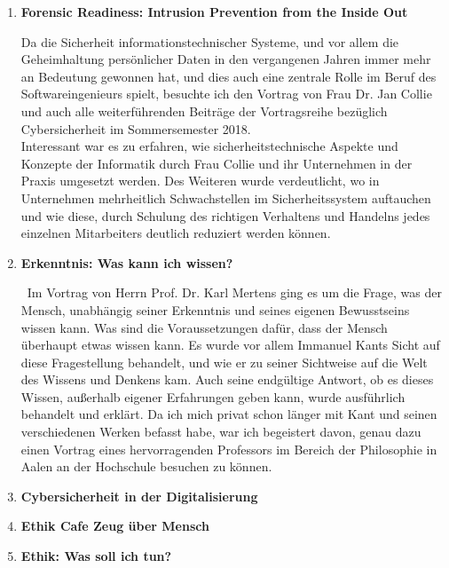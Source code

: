 \documentclass[a4paper, 12pt]{scrartcl} %
\begin{document}
\begin{enumerate}
\vspace{0.5cm}
\item\textbf{Forensic Readiness: Intrusion Prevention from the Inside Out}\par
Da die Sicherheit informationstechnischer Systeme, und vor allem die Geheimhaltung persönlicher Daten in den vergangenen Jahren immer mehr an Bedeutung gewonnen hat, und dies auch eine zentrale Rolle im Beruf des Softwareingenieurs spielt, besuchte ich den Vortrag von Frau Dr. Jan Collie und auch alle weiterführenden Beiträge der Vortragsreihe bezüglich Cybersicherheit im Sommersemester 2018.\\Interessant war es zu erfahren, wie sicherheitstechnische Aspekte und Konzepte der Informatik durch Frau Collie und ihr Unternehmen in der Praxis umgesetzt werden. Des Weiteren wurde verdeutlicht, wo in Unternehmen mehrheitlich Schwachstellen im Sicherheitssystem auftauchen und wie diese, durch Schulung des richtigen Verhaltens und Handelns jedes einzelnen Mitarbeiters deutlich reduziert werden können.
\vspace{0.5cm}
\item\textbf{Erkenntnis: Was kann ich wissen?}\par\
Im Vortrag von Herrn Prof. Dr. Karl Mertens ging es um die Frage, was der Mensch, unabhängig seiner Erkenntnis und seines eigenen Bewusstseins wissen kann. Was sind die Voraussetzungen dafür, dass der Mensch überhaupt etwas wissen kann. Es wurde vor allem Immanuel Kants Sicht auf diese Fragestellung behandelt, und wie er zu seiner Sichtweise auf die Welt des Wissens und Denkens kam. Auch seine endgültige Antwort, ob es dieses Wissen, außerhalb eigener Erfahrungen geben kann, wurde ausführlich behandelt und erklärt. Da ich mich privat schon länger mit Kant und seinen verschiedenen Werken befasst habe, war ich begeistert davon, genau dazu einen Vortrag eines hervorragenden Professors im Bereich der Philosophie in Aalen an der Hochschule besuchen zu können.\vspace{0.5cm}
\item\textbf{Cybersicherheit in der Digitalisierung}\par

\vspace{0.5cm}
\item\textbf{Ethik Cafe Zeug über Mensch}\par

\vspace{0.5cm}
\item\textbf{Ethik: Was soll ich tun?}\par


\end{enumerate}
\end{document}
